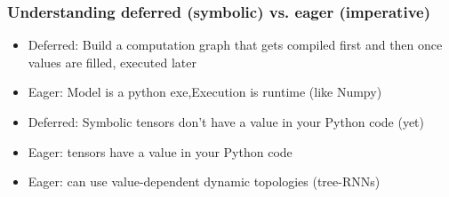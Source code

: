 
\begin{frame}[fragile] \frametitle{Understanding deferred (symbolic)
vs. eager (imperative)}

\begin{itemize}
\item  Deferred: Build a computation graph that gets compiled first and then once values are filled, executed later
\item  Eager: Model is a python exe,Execution is runtime (like Numpy)
\item Deferred: Symbolic tensors don’t have a value in your Python code (yet)
\item  Eager: tensors have a value in your Python code
\item Eager: can use value-dependent dynamic topologies 
(tree-RNNs)
\end{itemize}
\end{frame}




  



  
